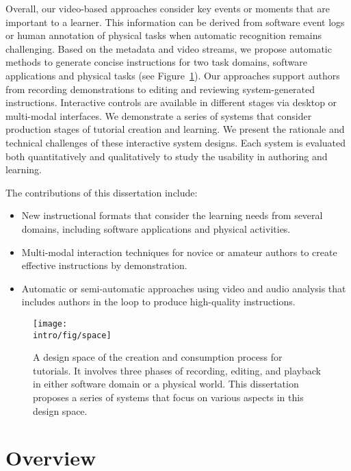 Overall, our video-based approaches consider key events or moments that are important to a learner. This information can be derived from software event logs or human annotation of physical tasks when automatic recognition remains challenging. Based on the metadata and video streams, we propose automatic methods to generate concise instructions for two task domains, software applications and physical tasks (see Figure~\ref{fig:space}). Our approaches support authors from recording demonstrations to editing and reviewing system-generated instructions. Interactive controls are available in different stages via desktop or multi-modal interfaces.
%
We demonstrate a series of systems that consider production stages of tutorial creation and learning. We present the rationale and technical challenges of these interactive system designs. Each system is evaluated both quantitatively and qualitatively to study the usability in authoring and learning.

\clearpage
The contributions of this dissertation include:

\begin{itemize}
\item New instructional formats that consider the learning needs from several domains, including software applications and physical activities.
\item Multi-modal interaction techniques for novice or amateur authors to create effective instructions by demonstration.
\item Automatic or semi-automatic approaches using video and audio analysis that includes authors in the loop to produce high-quality instructions.
\end{itemize}

\begin{figure}[t!]
  \centering
  \texttt{[image: \\intro/fig/space]}
  \caption{A design space of the creation and consumption process for tutorials. It involves three phases of recording, editing, and playback in either software domain or a physical world. This dissertation proposes a series of systems that focus on various aspects in this design space.}
  \label{fig:space}
\end{figure}


\section{Overview}

